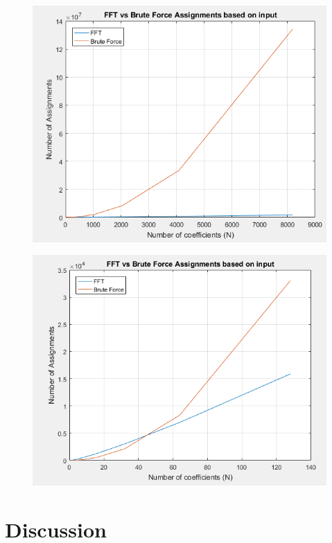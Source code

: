 \documentclass[12pt]{article}
\begin{document}
        \begin{figure}[H]
            \centerline{\includegraphics[scale=0.5]{images/BruteVSFFT_8192}}
        \end{figure} 
        \begin{figure}[H]
            \centerline{\includegraphics[scale=0.5]{images/BruteVSFFT_ZoomIn}}
        \end{figure}
        \section{Discussion}
        \cite{test}
        
        
        

    
\end{document}
